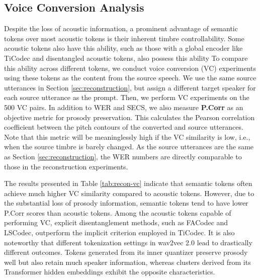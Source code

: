 \subsection{Voice Conversion Analysis}
Despite the loss of acoustic information, a prominent advantage of semantic tokens over most acoustic tokens is their inherent timbre controllability.
Some acoustic tokens also have this ability, such as those with a global encoder like TiCodec and disentangled acoustic tokens, also possess this ability
To compare this ability across different tokens, we conduct voice conversion (VC) experiments using these tokens as the content from the source speech. 
We use the same source utterances in Section \ref{sec:reconstruction}, but assign a different target speaker for each source utterance as the prompt.
Then, we perform VC experiments on the 500 VC pairs.
In addition to WER and SECS, we also measure \textbf{P.Corr} as an objective metric for prosody preservation. 
This calculates the Pearson correlation coefficient between the pitch contours of the converted and source utterances. 
Note that this metric will be meaninglessly high if the VC similarity is low, i.e., when the source timbre is barely changed.
As the source utterances are the same as Section \ref{sec:reconstruction}, the WER numbers are directly comparable to those in the reconstruction experiments.

The results presented in Table \ref{tab:recon-vc} indicate that semantic tokens often achieve much higher VC similarity compared to acoustic tokens. 
However, due to the substantial loss of prosody information, semantic tokens tend to have lower P.Corr scores than acoustic tokens.
Among the acoustic tokens capable of performing VC, explicit disentanglement methods, such as FACodec and LSCodec, outperform the implicit criterion employed in TiCodec.
It is also noteworthy that different tokenization settings in wav2vec 2.0 lead to drastically different outcomes. 
Tokens generated from its inner quantizer preserve prosody well but also retain much speaker information, whereas clusters derived from its Transformer hidden embeddings exhibit the opposite characteristics.

